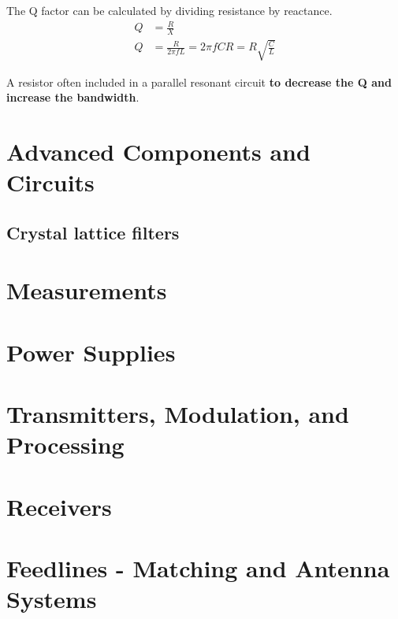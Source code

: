 \documentclass[letterpaper]{article}
\begin{document}
        The Q factor can be calculated by dividing resistance by reactance.
        \begin{align*}
            Q &= \frac{R}{X} \\
            Q &= \frac{R}{2 \pi f L} = 2 \pi f C R = R \sqrt{\frac{C}{L}}
        \end{align*}

        A resistor often included in a parallel resonant circuit \textbf{to decrease the Q and increase the bandwidth}.

    \newpage

    \section{Advanced Components and Circuits}
    \subsection{Crystal lattice filters}

    \newpage

    \section{Measurements}

    \newpage

    \section{Power Supplies}

    \newpage

    \section{Transmitters, Modulation, and Processing}

    \newpage

    \section{Receivers}

    \newpage

    \section{Feedlines - Matching and Antenna Systems}
\end{document}
